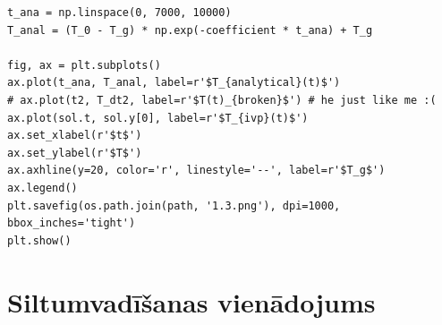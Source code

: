 \documentclass[12pt]{article}
\begin{document}
\begin{enumerate}
\begin{verbatim}
t_ana = np.linspace(0, 7000, 10000)
T_anal = (T_0 - T_g) * np.exp(-coefficient * t_ana) + T_g

fig, ax = plt.subplots()
ax.plot(t_ana, T_anal, label=r'$T_{analytical}(t)$')
# ax.plot(t2, T_dt2, label=r'$T(t)_{broken}$') # he just like me :(
ax.plot(sol.t, sol.y[0], label=r'$T_{ivp}(t)$')
ax.set_xlabel(r'$t$')
ax.set_ylabel(r'$T$')
ax.axhline(y=20, color='r', linestyle='--', label=r'$T_g$')
ax.legend()
plt.savefig(os.path.join(path, '1.3.png'), dpi=1000, bbox_inches='tight')
plt.show()
\end{verbatim}
  
\end{enumerate}

\newpage

\section*{Siltumvadīšanas vienādojums}
\end{document}
